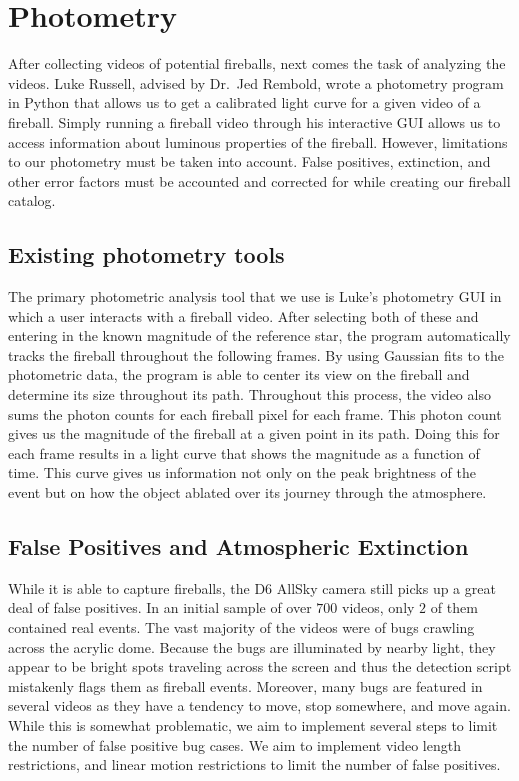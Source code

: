\section{Photometry}
After collecting videos of potential fireballs, next comes the task of analyzing the videos.
Luke Russell, advised by Dr.~Jed Rembold, wrote a photometry program in Python that allows us to get a calibrated light curve for a given video of a fireball.
Simply running a fireball video through his interactive GUI allows us to access information about luminous properties of the fireball.
However, limitations to our photometry must be taken into account.
False positives, extinction, and other error factors must be accounted and corrected for while creating our fireball catalog.

\subsection{Existing photometry tools}
The primary photometric analysis tool that we use is Luke's photometry GUI in which a user interacts with a fireball video.
After selecting both of these and entering in the known magnitude of the reference star, the program automatically tracks the fireball throughout the following frames.
By using Gaussian fits to the photometric data, the program is able to center its view on the fireball and determine its size throughout its path.
Throughout this process, the video also sums the photon counts for each fireball pixel for each frame.
This photon count gives us the magnitude of the fireball at a given point in its path.
Doing this for each frame results in a light curve that shows the magnitude as a function of time.
This curve gives us information not only on the peak brightness of the event but on how the object ablated over its journey through the atmosphere.

\subsection{False Positives and Atmospheric Extinction}

While it is able to capture fireballs, the D6 AllSky camera still picks up a great deal of false positives.
In an initial sample of over $700$ videos, only $2$ of them contained real events.
The vast majority of the videos were of bugs crawling across the acrylic dome.
Because the bugs are illuminated by nearby light, they appear to be bright spots traveling across the screen and thus the detection script mistakenly flags them as fireball events.
Moreover, many bugs are featured in several videos as they have a tendency to move, stop somewhere, and move again.
While this is somewhat problematic, we aim to implement several steps to limit the number of false positive bug cases. 
We aim to implement video length restrictions, and linear motion restrictions to limit the number of false positives.

